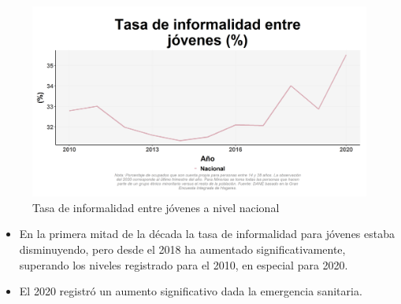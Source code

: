     \begin{figure}[H]
        \caption{Tasa de informalidad entre jóvenes a nivel nacional \label{map_result_2} }
        \begin{center}
        \includegraphics[width=\textwidth,keepaspectratio]{img/var_76_trend.png}
        \end{center}
    \end{figure}
            \begin{itemize}
                \item En la primera mitad de la década la tasa de informalidad para jóvenes estaba disminuyendo, pero desde el 2018 ha aumentado significativamente, superando los niveles registrado para el 2010, en especial para 2020.
                \item El 2020 registró un aumento significativo dada la emergencia sanitaria.
                \end{itemize}

